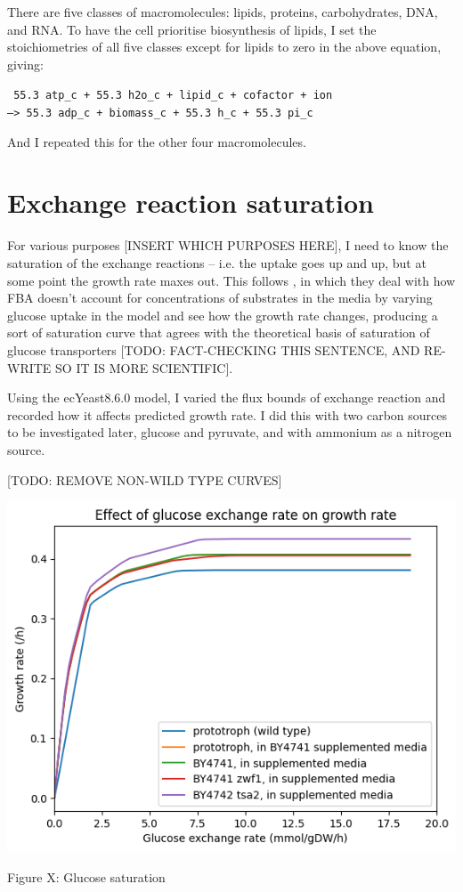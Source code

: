There are five classes of macromolecules: lipids, proteins, carbohydrates, DNA, and RNA.
To have the cell prioritise biosynthesis of lipids, I set the stoichiometries of all five classes except for lipids to zero in the above equation, giving:

\texttt{
  55.3 atp\_c + 55.3 h2o\_c + lipid\_c + cofactor + ion \\
  --> 55.3 adp\_c + biomass\_c + 55.3 h\_c + 55.3 pi\_c
}

And I repeated this for the other four macromolecules.

\section{Exchange reaction saturation}
\label{sec:model-saturation}

For various purposes [INSERT WHICH PURPOSES HERE], I need to know the saturation of the exchange reactions -- i.e. the uptake goes up and up, but at some point the growth rate maxes out.
This follows \textcite{elsemmanWholecellModelingYeast2022}, in which they deal with how FBA doesn't account for concentrations of substrates in the media by varying glucose uptake in the model and see how the growth rate changes, producing a sort of saturation curve that agrees with the theoretical basis of saturation of glucose transporters [TODO: FACT-CHECKING THIS SENTENCE, AND RE-WRITE SO IT IS MORE SCIENTIFIC].

Using the ecYeast8.6.0 model, I varied the flux bounds of exchange reaction and recorded how it affects predicted growth rate.
I did this with two carbon sources to be investigated later, glucose and pyruvate, and with ammonium as a nitrogen source.

[TODO: REMOVE NON-WILD TYPE CURVES]

\begin{center}
\includegraphics[width=.9\linewidth]{ecYeast8-glucose-saturation.png}
\end{center} Figure X: Glucose saturation

